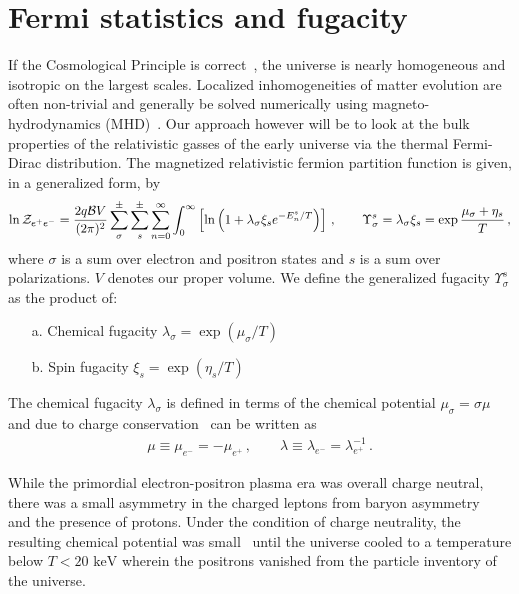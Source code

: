 \documentclass[a4paper]{article}
\newcommand*{\keV}{\text{ keV}}
\begin{document}
\section{Fermi statistics and fugacity}
\label{sec:fugacity}
\noindent If the Cosmological Principle is correct~\cite{abdalla2022cosmology}, the universe is nearly homogeneous and isotropic on the largest scales. Localized inhomogeneities of matter evolution are often non-trivial and generally be solved numerically using magneto-hydrodynamics (MHD)~\cite{melrose2008quantum,vazza2017simulations}. Our approach however will be to look at the bulk properties of the relativistic gasses of the early universe via the thermal Fermi-Dirac distribution. The magnetized relativistic fermion partition function is given, in a generalized form, by
\begin{align}
    \label{partition}
    \ln{\cal Z}_{e^{+}e^{-}}=\frac{2q{\cal B}V}{(2\pi)^{2}}\sum_{\sigma}^{\pm}\sum_{s}^{\pm}\sum_{n=0}^{\infty}\int_{0}^{\infty}\left[\ln\left(1+\lambda_{\sigma}\xi_{s}e^{-E_{n}^{s}/T}\right)\right]\,,\qquad\Upsilon_{\sigma}^{s}=\lambda_{\sigma}\xi_{s}=\exp{\frac{\mu_{\sigma}+\eta_{s}}{T}}\,,
\end{align}
where $\sigma$ is a sum over electron and positron states and $s$ is a sum over polarizations. $V$ denotes our proper volume. We define the generalized fugacity $\Upsilon_{\sigma}^{s}$ as the product of:
\begin{itemize}
    \item[a.] Chemical fugacity $\lambda_{\sigma}=\exp{(\mu_{\sigma}/T)}$
    \item[b.] Spin fugacity $\xi_{s}=\exp{(\eta_{s}/T)}$
\end{itemize}
The chemical fugacity $\lambda_{\sigma}$ is defined in terms of the chemical potential $\mu_{\sigma}=\sigma\mu$ and due to charge conservation~\cite{elze1980relativistic} can be written as 
\begin{align}
    \label{cpotential}
    \mu\equiv\mu_{e^{-}}=-\mu_{e^{+}}\,,\qquad
    \lambda\equiv\lambda_{e^{-}}=\lambda_{e^{+}}^{-1}\,.
\end{align}

While the primordial electron-positron plasma era was overall charge neutral, there was a small asymmetry in the charged leptons from baryon asymmetry~\cite{canetti2012matter} and the presence of protons. Under the condition of charge neutrality, the resulting chemical potential was small~\cite{rafelski2023short} until the universe cooled to a temperature below $T<20\keV$ wherein the positrons vanished from the particle inventory of the universe.
\end{document}
